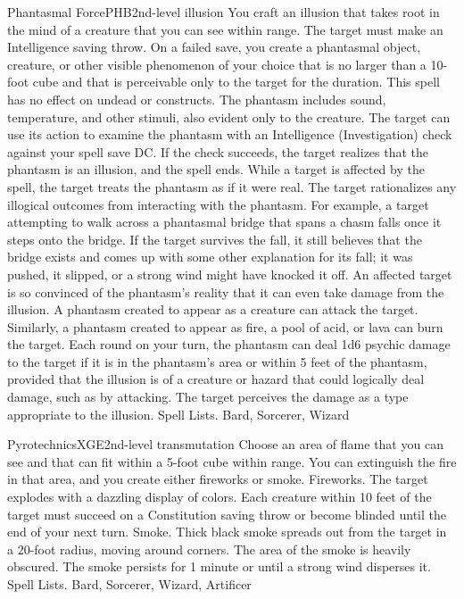 \begin{spell}{Phantasmal Force}{PHB}{2nd-level illusion}
{
}
You craft an illusion that takes root in the mind of a creature that you can see within range. The target must make an Intelligence saving throw. On a failed save, you create a phantasmal object, creature, or other visible phenomenon of your choice that is no larger than a 10-foot cube and that is perceivable only to the target for the duration. This spell has no effect on undead or constructs.
The phantasm includes sound, temperature, and other stimuli, also evident only to the creature.
The target can use its action to examine the phantasm with an Intelligence (Investigation) check against your spell save DC. If the check succeeds, the target realizes that the phantasm is an illusion, and the spell ends.
While a target is affected by the spell, the target treats the phantasm as if it were real. The target rationalizes any illogical outcomes from interacting with the phantasm. For example, a target attempting to walk across a phantasmal bridge that spans a chasm falls once it steps onto the bridge. If the target survives the fall, it still believes that the bridge exists and comes up with some other explanation for its fall; it was pushed, it slipped, or a strong wind might have knocked it off.
An affected target is so convinced of the phantasm’s reality that it can even take damage from the illusion. A phantasm created to appear as a creature can attack the target. Similarly, a phantasm created to appear as fire, a pool of acid, or lava can burn the target. Each round on your turn, the phantasm can deal 1d6 psychic damage to the target if it is in the phantasm’s area or within 5 feet of the phantasm, provided that the illusion is of a creature or hazard that could logically deal damage, such as by attacking. The target perceives the damage as a type appropriate to the illusion.
Spell Lists. Bard, Sorcerer, Wizard
\end{spell}

\begin{spell}{Pyrotechnics}{XGE}{2nd-level transmutation}
{
}
Choose an area of flame that you can see and that can fit within a 5-foot cube within range. You can extinguish the fire in that area, and you create either fireworks or smoke.
Fireworks. The target explodes with a dazzling display of colors. Each creature within 10 feet of the target must succeed on a Constitution saving throw or become blinded until the end of your next turn.
Smoke. Thick black smoke spreads out from the target in a 20-foot radius, moving around corners. The area of the smoke is heavily obscured. The smoke persists for 1 minute or until a strong wind disperses it.
Spell Lists. Bard, Sorcerer, Wizard, Artificer
\end{spell}

